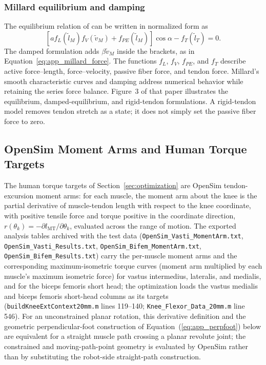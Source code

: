 \subsubsection{Millard equilibrium and damping}

The equilibrium relation of \citet{millard_flexing_2013} can be written in normalized form as
\begin{equation}
 \left[a f_L(\tilde l_M)f_V(\tilde v_M)+f_{PE}(\tilde l_M)\right]\cos\alpha
 -f_T(\tilde l_T)=0.
 \label{eq:app_millard_equilibrium}
\end{equation}
The damped formulation adds $\beta\tilde v_M$ inside the brackets, as in Equation~\ref{eq:app_millard_force}. The functions $f_L$, $f_V$, $f_{PE}$, and $f_T$ describe active force--length, force--velocity, passive fiber force, and tendon force. Millard's smooth characteristic curves and damping address numerical behavior while retaining the series force balance. Figure~3 of that paper illustrates the equilibrium, damped-equilibrium, and rigid-tendon formulations. A rigid-tendon model removes tendon stretch as a state; it does not simply set the passive fiber force to zero.


\subsection{OpenSim Moment Arms and Human Torque Targets}
\label{sec:app_opensim_targets}

The human torque targets of Section~\ref{sec:optimization} are OpenSim
tendon-excursion moment arms: for each muscle, the moment arm about the
knee is the partial derivative of muscle-tendon length with respect to
the knee coordinate, with positive tensile force and torque positive in the coordinate direction, $r(\theta_{k}) = -\partial l_{\mathrm{MT}} /
\partial\theta_{k}$, evaluated across the range of motion. The exported
analysis tables archived with the test data
(\nolinkurl{OpenSim_Vasti_MomentArm.txt}, \nolinkurl{OpenSim_Vasti_Results.txt},
\nolinkurl{OpenSim_Bifem_MomentArm.txt}, \nolinkurl{OpenSim_Bifem_Results.txt})
carry the per-muscle moment arms and the corresponding
maximum-isometric torque curves (moment arm multiplied by each
muscle's maximum isometric force) for vastus intermedius,
lateralis, and medialis, and for the biceps femoris short head; the
optimization loads the vastus medialis and biceps femoris short-head
columns as its targets (\texttt{buildKneeExtContext20mm.m} lines
119--140; \nolinkurl{Knee_Flexor_Data_20mm.m} line 546). For an unconstrained planar rotation, this
derivative definition and the geometric perpendicular-foot construction
of Equation~(\ref{eq:app_perpfoot}) below are equivalent for a straight
muscle path crossing a planar revolute joint; the constrained and moving-path-point geometry is evaluated by OpenSim rather than by substituting the robot-side straight-path construction.

